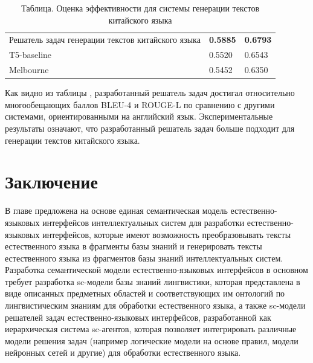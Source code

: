 \renewcommand\arraystretch{2}
\begin{table}[]
	\caption{Таблица. Оценка эффективности для системы генерации текстов китайского языка}
	\centering
	\begin{tabular}{|m{8em}|m{8em}|m{8em}|}
		\hline
		{}& \makecell[c]{BLEU-4} & \makecell[c]{ROUGE-L} \\
		\hline 
		Решатель задач генерации текстов китайского языка & \textbf{0.5885} & \textbf{0.6793} \\
		\hline
		T5-baseline & 0.5520 & 0.6543 \\
		\hline
		Melbourne & 0.5452 & 0.6350 \\
		\hline
	\end{tabular}
	\label{table:text-generation}
\end{table}

Как видно из таблицы \textit{}, разработанный решатель задач достигал относительно многообещающих баллов BLEU-4 и ROUGE-L по сравнению с другими системами, ориентированными на английский язык. Экспериментальные результаты означают, что разработанный решатель задач больше подходит для генерации текстов китайского языка. 

\section*{Заключение}
В главе предложена на основе  единая семантическая модель естественно-языковых интерфейсов интеллектуальных систем для разработки естественно-языковых интерфейсов, которые имеют возможность преобразовывать тексты естественного языка в фрагменты базы знаний и генерировать тексты естественного языка из фрагментов базы знаний интеллектуальных систем. Разработка семантической модели естественно-языковых интерфейсов в основном требует разработка sc-модели базы знаний лингвистики, которая представлена в виде описанных предметных областей и соответствующих им онтологий по лингвистическим знаниям для обработки естественного языка, а также sc-модели решателей задач естественно-языковых интерфейсов, разработанной как иерархическая система sc-агентов, которая позволяет интегрировать различные модели решения задач (например логические модели на основе правил, модели нейронных сетей и другие) для обработки естественного языка.

